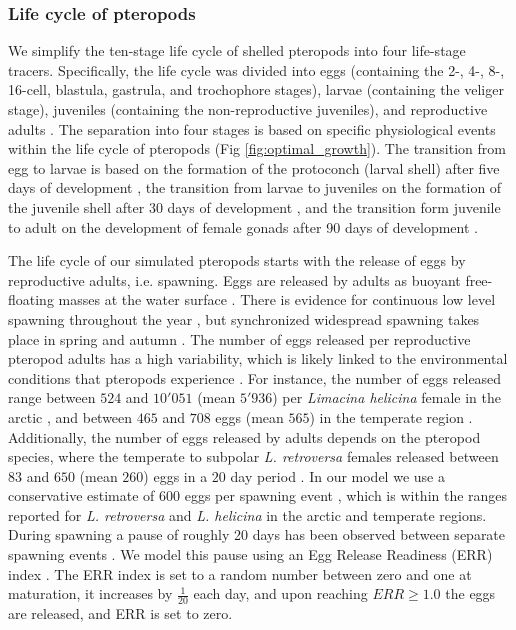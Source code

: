 \subsubsection{Life cycle of pteropods}
We simplify the ten-stage life cycle of shelled pteropods \citep{Howes2014Lab,Thabet2015Lifestages} into four life-stage tracers. Specifically, the life cycle was divided into eggs (containing the 2-, 4-, 8-, 16-cell, blastula, gastrula, and trochophore stages), larvae (containing the veliger stage), juveniles (containing the non-reproductive juveniles), and reproductive adults \citep{Howes2014Lab,Thabet2015Lifestages}. The separation into four stages is based on specific physiological events within the life cycle of pteropods  (Fig \ref{fig:optimal_growth}). The transition from egg to larvae is based on the formation of the protoconch (larval shell) after five days of development \citep{Thabet2015Lifestages}, the transition from larvae to juveniles on the formation of the juvenile shell after 30 days of development \citep{Thabet2015Lifestages}, and the transition form juvenile to adult on the development of female gonads after 90 days of development \citep{lalli1989pelagic,Thabet2015Lifestages,Bednarsek2016CumulativeEffects}. 

The life cycle of our simulated pteropods starts with the release of eggs by reproductive adults, i.e. spawning. Eggs are released by adults as buoyant free-floating masses at the water surface \citep{Lalli1978Reproduction,Paranjape1968egg,Schalk1990SeasonalSpatial,Gannefors2005Overwintering,Comeau2010Predation,Manno2016EggsAcidification}. There is evidence for continuous low level spawning  throughout the year \citep{Wang2017Lifecycle,Thabet2015Lifestages}, but synchronized widespread spawning takes place in spring and autumn \citep{lalli1989pelagic,Thabet2015Lifestages,Wang2017Lifecycle}. The number of eggs released per reproductive pteropod adults has a high variability, which is likely linked to the environmental conditions that pteropods experience \citep{Manno2016EggsAcidification}. For instance, the number of eggs released range between $524$ and $10'051$ (mean $5'936$) per \textit{Limacina helicina} female in the arctic \citep{Lalli1978Reproduction}, and between $465$ and $708$ eggs (mean $565$) in the temperate region \citep{Paranjape1968egg}. Additionally, the number of eggs released by adults depends on the pteropod species, where the temperate to subpolar \textit{L. retroversa} females released  between $83$ and $650$ (mean $260$) eggs in a $20$ day period \citep{Lalli1978Reproduction}. In our model we use a conservative estimate of $600$ eggs per spawning event \citep{Paranjape1968egg}, which is within the ranges reported for \textit{L. retroversa} and \textit{L. helicina} in the arctic and temperate regions. During spawning a pause of roughly 20 days has been observed between separate spawning events \citep{Paranjape1968egg}. We model this pause using an Egg Release Readiness (ERR) index \citep[similar to the Clutch Readiness Fraction presented in ][]{Miller1998CalanusIBM}. The ERR index is set to a random number between zero and one at maturation, it increases by $\frac{1}{20}$ each day, and upon reaching $ERR \geq 1.0$ the eggs are released, and ERR is set to zero. 

